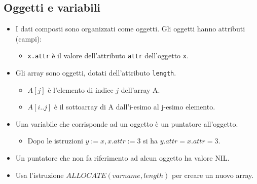 \subsection{Oggetti e variabili}

\begin{multicols}{2} %

\begin{itemize}
    \item I dati composti sono organizzati come oggetti. Gli oggetti hanno attributi (campi):
    \begin{itemize}
        \item \texttt{x.attr} è il valore dell'attributo \texttt{attr} dell'oggetto \texttt{x}.
    \end{itemize}
    \item Gli array sono oggetti, dotati dell'attributo \texttt{length}.
    \begin{itemize}
        \item \(A[j]\) è l'elemento di indice \(j\) dell'array A.
        \item \(A[i..j]\) è il sottoarray di A dall'i-esimo al j-esimo elemento.
    \end{itemize}
    \item Una variabile che corrisponde ad un oggetto è un puntatore all'oggetto.
    \begin{itemize}
        \item Dopo le istruzioni \( y := x, x.attr := 3 \) si ha \( y.attr = x.attr = 3 \).
    \end{itemize}
    \item Un puntatore che non fa riferimento ad alcun oggetto ha valore NIL.
    \item Usa l'istruzione \texttt{$ALLOCATE(varname, length)$} per creare un nuovo array.
\end{itemize}

\end{multicols}
